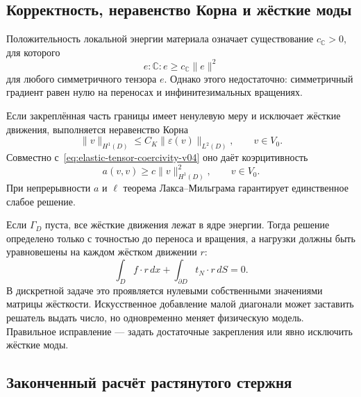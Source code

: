 \subsection{Корректность, неравенство Корна и жёсткие моды}

Положительность локальной энергии материала означает существование $c_{\mathbb C}>0$, для которого
\begin{equation}
\label{eq:elastic-tensor-coercivity-v04}
 e:\mathbb C:e
 \ge c_{\mathbb C}\lVert e\rVert^2
\end{equation}
для любого симметричного тензора $e$. Однако этого недостаточно: симметричный градиент равен нулю на переносах и инфинитезимальных вращениях.

Если закреплённая часть границы имеет ненулевую меру и исключает жёсткие движения, выполняется неравенство Корна
\begin{equation}
\label{eq:korn-inequality-v04}
 \lVert v\rVert_{H^1(D)}
 \le C_K\lVert\varepsilon(v)\rVert_{L^2(D)},
 \qquad v\in V_0.
\end{equation}
Совместно с~\eqref{eq:elastic-tensor-coercivity-v04} оно даёт коэрцитивность
\begin{equation}
\label{eq:elastic-coercivity-v04}
 a(v,v)
 \ge c\lVert v\rVert_{H^1(D)}^2,
 \qquad v\in V_0.
\end{equation}
При непрерывности $a$ и $\ell$ теорема Лакса--Мильграма гарантирует единственное слабое решение.

Если $\Gamma_D$ пуста, все жёсткие движения лежат в ядре энергии. Тогда решение определено только с точностью до переноса и вращения, а нагрузки должны быть уравновешены на каждом жёстком движении $r$:
\begin{equation}
\label{eq:pure-traction-compatibility-v04}
 \int_D f\cdot r\,dx
 +\int_{\partial D}t_N\cdot r\,dS
 =0.
\end{equation}
В дискретной задаче это проявляется нулевыми собственными значениями матрицы жёсткости. Искусственное добавление малой диагонали может заставить решатель выдать число, но одновременно меняет физическую модель. Правильное исправление --- задать достаточные закрепления или явно исключить жёсткие моды.

\subsection{Законченный расчёт растянутого стержня}
\label{subsec:worked-bar-v04}

